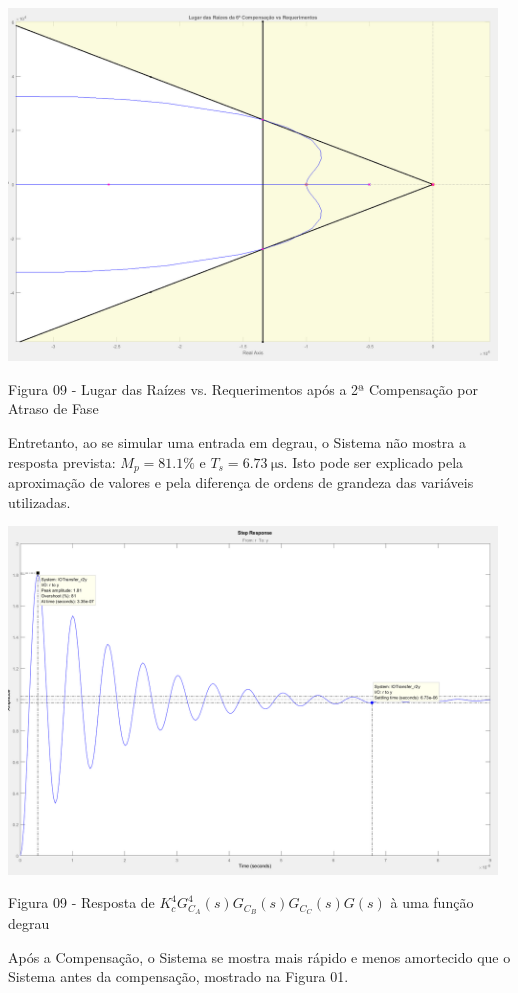 \documentclass[a4paper]{article}
\begin{document}
\begin{center}
	\includegraphics[width=35em,keepaspectratio]{lugar_das_raizes_16_compensacao_requerimentos}
	\par Figura 09 - Lugar das Raízes vs. Requerimentos após a 2ª Compensação por Atraso de Fase
\end{center}
	\vspace{0.5em} 
	\par Entretanto, ao se simular uma entrada em degrau, o Sistema não mostra a resposta prevista: $M_p = 81.1\%$ e $T_s=\SI{6.73}{\micro\second}$. Isto pode ser explicado pela aproximação de valores e pela diferença de ordens de grandeza das variáveis utilizadas. 
\begin{center}
	\includegraphics[width=35em,keepaspectratio]{lugar_das_raizes_17_compensacao_requerimentos}
	\par Figura 09 - Resposta de $K_c^4G_{C_A}^4(s)G_{C_B}(s)G_{C_C}(s)G(s)$ à uma função degrau
\end{center}
\par Após a Compensação, o Sistema se mostra mais rápido e menos amortecido que o Sistema antes da compensação, mostrado na Figura 01.
\end{document}
